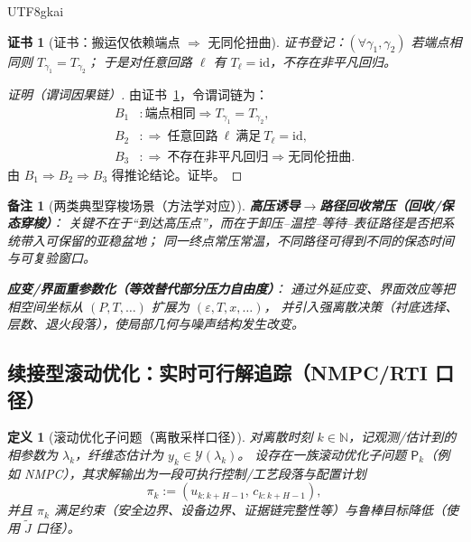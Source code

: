 \documentclass[12pt]{article}
\newtheorem{definition}{定义}[section]
\newtheorem{remark}{备注}[section]
\newtheorem{Certificate}{证书}[section]
\newcommand{\NN}{\mathbb{N}}
\begin{document}
\begin{CJK*}{UTF8}{gkai}
\begin{Certificate}[证书：搬运仅依赖端点 $\Rightarrow$ 无同伦扭曲]
\label{cert:untwisted-reduces-to-endpoint-control}
证书登记：$(\forall \gamma_1,\gamma_2)$ 若端点相同则 $T_{\gamma_1}=T_{\gamma_2}$；
于是对任意回路 $\ell$ 有 $T_{\ell}=\mathrm{id}$，不存在非平凡回归。
\end{Certificate}

\begin{proof}[证明（谓词因果链）]
由证书~\ref{cert:untwisted-reduces-to-endpoint-control}，令谓词链为：
\[
\begin{aligned}
  B_1 &: \text{端点相同}\Rightarrow T_{\gamma_1}=T_{\gamma_2},\\
  B_2 &: \Rightarrow\ \text{任意回路}\ \ell\ \text{满足}\ T_{\ell}=\mathrm{id},\\
  B_3 &: \Rightarrow\ \text{不存在非平凡回归}\Rightarrow \text{无同伦扭曲}.
\end{aligned}
\]
由 $B_1\Rightarrow B_2\Rightarrow B_3$ 得推论结论。证毕。
\end{proof}

\begin{remark}[两类典型穿梭场景（方法学对应）]
\textbf{高压诱导$\to$路径回收常压（回收/保态穿梭）}：
关键不在于“到达高压点”，而在于卸压--温控--等待--表征路径是否把系统带入可保留的亚稳盆地；
同一终点常压常温，不同路径可得到不同的保态时间与可复验窗口\cite{ref_pnas_2501048122}。

\textbf{应变/界面重参数化（等效替代部分压力自由度）}：
通过外延应变、界面效应等把相空间坐标从 $(P,T,\dots)$ 扩展为 $(\varepsilon,T,x,\dots)$，
并引入强离散决策（衬底选择、层数、退火段落），使局部几何与噪声结构发生改变\cite{ref_pubmed_39701131,ref_aps_prmaterials_8_044801}。
\end{remark}

\subsection{续接型滚动优化：实时可行解追踪（NMPC/RTI 口径）}
\label{sec:continuation-rt-optimization}

\begin{definition}[滚动优化子问题（离散采样口径）]
对离散时刻 $k\in\NN$，记观测/估计到的相参数为 $\lambda_k$，纤维态估计为 $y_k\in\mathcal{Y}(\lambda_k)$。
设存在一族滚动优化子问题 $\mathsf{P}_k$（例如 NMPC），其求解输出为一段可执行控制/工艺段落与配置计划
\[
  \pi_k := (u_{k:k+H-1},\,c_{k:k+H-1}),
\]
并且 $\pi_k$ 满足约束（安全边界、设备边界、证据链完整性等）与鲁棒目标降低（使用 $\tilde J$ 口径）。
\end{definition}


\end{CJK*}
\end{document}
